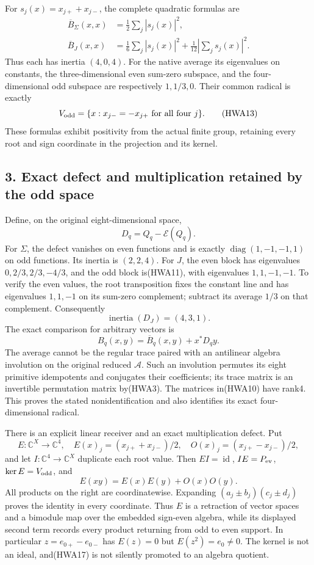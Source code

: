 \documentclass[
  10pt,
  a4paper,
]{article}
\begin{document}
For \(s_j(x)=x_{j+}+x_{j-}\), the complete quadratic formulas are \[
\begin{aligned}
\overline B_\Sigma(x,x)&=\frac12\sum_j|s_j(x)|^2,\\
\overline B_J(x,x)&=\frac16\sum_j|s_j(x)|^2
 +\frac1{12}\left|\sum_js_j(x)\right|^2.
\end{aligned}
\tag{HWA12}
\] Thus each has inertia \((4,0,4)\). For the native average its
eigenvalues on constants, the three-dimensional even sum-zero subspace,
and the four-dimensional odd subspace are respectively \(1,1/3,0\).
Their common radical is exactly \[
V_{\rm odd}=\{x:x_{j-}=-x_{j+}\ \text{for all four }j\}.
\tag{HWA13}
\] These formulas exhibit positivity from the actual finite group,
retaining every root and sign coordinate in the projection and its
kernel.

\subsection{3. Exact defect and multiplication retained by the odd
space}\label{exact-defect-and-multiplication-retained-by-the-odd-space}

Define, on the original eight-dimensional space, \[
D_q=Q_q-\mathscr E(Q_q).
\tag{HWA14}
\] For \(\Sigma\), the defect vanishes on even functions and is exactly
\(\operatorname{diag}(1,-1,-1,1)\) on odd functions. Its inertia is
\((2,2,4)\). For \(J\), the even block has eigenvalues
\(0,2/3,2/3,-4/3\), and the odd block is(HWA11), with eigenvalues
\(1,1,-1,-1\). To verify the even values, the root transposition fixes
the constant line and has eigenvalues \(1,1,-1\) on its sum-zero
complement; subtract its average \(1/3\) on that complement.
Consequently \[
\operatorname{inertia}(D_J)=(4,3,1).
\tag{HWA15}
\] The exact comparison for arbitrary vectors is \[
B_q(x,y)=\overline B_q(x,y)+x^*D_qy.
\tag{HWA16}
\] The average cannot be the regular trace paired with an antilinear
algebra involution on the original reduced \(\mathcal A\). Such an
involution permutes its eight primitive idempotents and conjugates their
coefficients; its trace matrix is an invertible permutation matrix
by(HWA3). The matrices in(HWA10) have rank4. This proves the stated
nonidentification and also identifies its exact four-dimensional
radical.

There is an explicit linear receiver and an exact multiplication defect.
Put \[
E:\mathbb C^X\to\mathbb C^4,
\quad E(x)_j=(x_{j+}+x_{j-})/2,
\quad O(x)_j=(x_{j+}-x_{j-})/2,
\tag{HWA17}
\] and let \(I:\mathbb C^4\to\mathbb C^X\) duplicate each root value.
Then \(EI=\operatorname{id}\), \(IE=P_{\rm ev}\),
\(\ker E=V_{\rm odd}\), and \[
E(xy)=E(x)E(y)+O(x)O(y).
\tag{HWA18}
\] All products on the right are coordinatewise. Expanding
\((a_j\pm b_j)(c_j\pm d_j)\) proves the identity in every coordinate.
Thus \(E\) is a retraction of vector spaces and a bimodule map over the
embedded sign-even algebra, while its displayed second term records
every product returning from odd to even support. In particular
\(z=e_{0+}-e_{0-}\) has \(E(z)=0\) but \(E(z^2)=e_0\ne0\). The kernel is
not an ideal, and(HWA17) is not silently promoted to an algebra
quotient.
\end{document}
